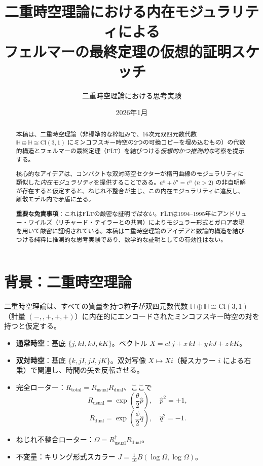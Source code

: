 \documentclass[a4paper]{article}
\title{二重時空理論における内在モジュラリティによる\\フェルマーの最終定理の仮想的証明スケッチ}
\author{二重時空理論における思考実験}
\date{2026年1月}
\begin{document}

\maketitle

\begin{abstract}
本稿は、二重時空理論（非標準的な枠組みで、16次元双四元数代数 $\mathbb{H} \oplus \mathbb{H} \cong \mathrm{Cl}(3,1)$ にミンコフスキー時空の2つの可換コピーを埋め込むもの）の代数的構造とフェルマーの最終定理（FLT）を結びつける\emph{仮想的かつ推測的な}考察を提示する。

核心的なアイデアは、コンパクトな双対時空セクターが楕円曲線のモジュラリティに類似した\emph{内在モジュラリティ}を提供することである。$a^n + b^n = c^n$ ($n>2$) の非自明解が存在すると仮定すると、ねじれ不整合が生じ、この内在モジュラリティに違反し、離散モデル内で矛盾に至る。

\textbf{重要な免責事項}：これはFLTの厳密な証明\emph{ではない}。FLTは1994--1995年にアンドリュー・ワイルズ（リチャード・テイラーとの共同）によりモジュラー形式とガロア表現を用いて厳密に証明されている。本稿は二重時空理論のアイデアと数論的構造を結びつける純粋に推測的な思考実験であり、数学的な証明としての有効性はない。
\end{abstract}

\section{背景：二重時空理論}

二重時空理論は、すべての質量を持つ粒子が双四元数代数 $\mathbb{H} \oplus \mathbb{H} \cong \mathrm{Cl}(3,1)$（計量 $(-,,+,+,+)$）に内在的にエンコードされたミンコフスキー時空の対を持つと仮定する。

\begin{itemize}
  \item \textbf{通常時空}：基底 $\{j, kI, kJ, kK\}$。ベクトル $X = ct\, j + x\, kI + y\, kJ + z\, kK$。
  \item \textbf{双対時空}：基底 $\{k, jI, jJ, jK\}$。双対写像 $X \mapsto Xi$（擬スカラー $i$ による右乗）で関連し、時間の矢を反転させる。
  \item 完全ローター：$R_\text{total} = R_\text{usual} R_\text{dual}$、ここで
  \[
  R_\text{usual} = \exp\!\left(\frac{\theta}{2} \hat{p}\right), \quad \hat{p}^2 = +1,
  \]
  \[
  R_\text{dual} = \exp\!\left(\frac{\phi}{2} \hat{q}\right), \quad \hat{q}^2 = -1.
  \]
  \item ねじれ不整合ローター：$\Omega = R_\text{usual}^\dagger R_\text{dual}$。
  \item 不変量：キリング形式スカラー $J = \frac{1}{16} B(\log \Omega, \log \Omega)$。
\end{itemize}
\end{document}
